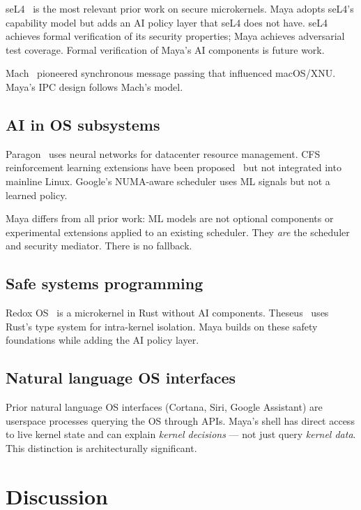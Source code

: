 \documentclass[letterpaper,twocolumn,10pt]{article}
\begin{document}
seL4~\cite{sel4} is the most relevant prior
work on secure microkernels. Maya adopts
seL4's capability model but adds an AI policy
layer that seL4 does not have. seL4 achieves
formal verification of its security properties;
Maya achieves adversarial test coverage. Formal
verification of Maya's AI components is future
work.

Mach~\cite{mach} pioneered synchronous message
passing that influenced macOS/XNU. Maya's IPC
design follows Mach's model.

\subsection{AI in OS subsystems}

Paragon~\cite{paragon} uses neural networks
for datacenter resource management. CFS
reinforcement learning extensions have been
proposed~\cite{rl-scheduling} but not
integrated into mainline Linux. Google's
NUMA-aware scheduler uses ML signals but
not a learned policy.

Maya differs from all prior work: ML models
are not optional components or experimental
extensions applied to an existing scheduler.
They \textit{are} the scheduler and security
mediator. There is no fallback.

\subsection{Safe systems programming}

Redox OS~\cite{redox} is a microkernel in
Rust without AI components. Theseus~\cite{theseus}
uses Rust's type system for intra-kernel
isolation. Maya builds on these safety
foundations while adding the AI policy layer.

\subsection{Natural language OS interfaces}

Prior natural language OS interfaces (Cortana,
Siri, Google Assistant) are userspace processes
querying the OS through APIs. Maya's shell has
direct access to live kernel state and can
explain \textit{kernel decisions} --- not just
query \textit{kernel data}. This distinction
is architecturally significant.

\section{Discussion}
\end{document}
